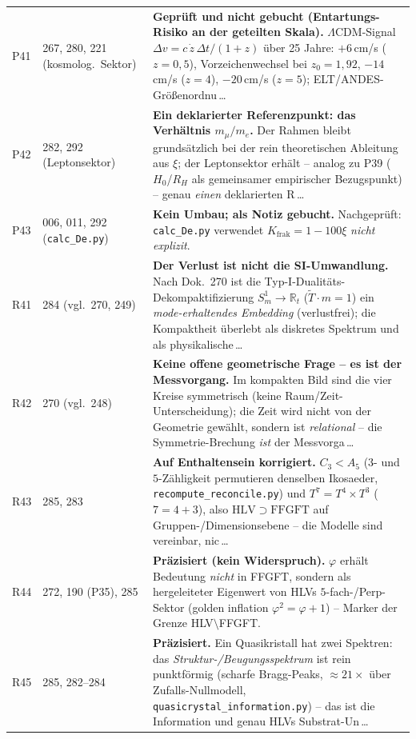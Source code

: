 \begin{longtable}{@{}p{0.9cm}p{3.1cm}p{10.2cm}@{}}
P41 & 267, 280, 221 (kosmolog.\ Sektor) & \textbf{Geprüft und nicht gebucht (Entartungs-Risiko an der geteilten Skala).} $\Lambda$CDM-Signal $\Delta v=c\,\dot z\,\Delta t/(1+z)$ über 25 Jahre: $+6$\,cm/s ($z{=}0{,}5$), Vorzeichenwechsel bei $z_0=1{,}92$, $-14$\,cm/s ($z{=}4$), $-20$\,cm/s ($z{=}5$); ELT/ANDES-Größenordnu\,\ldots \\
P42 & 282, 292 (Leptonsektor) & \textbf{Ein deklarierter Referenzpunkt: das Verhältnis $m_\mu/m_e$.} Der Rahmen bleibt grundsätzlich bei der rein theoretischen Ableitung aus $\xi$; der Leptonsektor erhält -- analog zu P39 ($H_0$/$R_H$ als gemeinsamer empirischer Bezugspunkt) -- genau \emph{einen} deklarierten R\,\ldots \\
P43 & 006, 011, 292 (\texttt{calc\_De.py}) & \textbf{Kein Umbau; als Notiz gebucht.} Nachgeprüft: \texttt{calc\_De.py} verwendet $K_{\text{frak}}=1-100\xi$ \emph{nicht explizit}. \\
R41 & 284 (vgl.\ 270, 249) & \textbf{Der Verlust ist nicht die SI-Umwandlung.} Nach Dok.~270 ist die Typ-I-Dualitäts-Dekompaktifizierung $S^1_m\!\to\!\mathbb{R}_t$ ($\tilde{T}\cdot m=1$) ein \emph{mode-erhaltendes Embedding} (verlustfrei); die Kompaktheit überlebt als diskretes Spektrum und als physikalische\,\ldots \\
R42 & 270 (vgl.\ 248) & \textbf{Keine offene geometrische Frage -- es ist der Messvorgang.} Im kompakten Bild sind die vier Kreise symmetrisch (keine Raum/Zeit-Unterscheidung); die Zeit wird nicht von der Geometrie gewählt, sondern ist \emph{relational} -- die Symmetrie-Brechung \emph{ist} der Messvorga\,\ldots \\
R43 & 285, 283 & \textbf{Auf Enthaltensein korrigiert.} $C_3<A_5$ ($3$- und $5$-Zähligkeit permutieren denselben Ikosaeder, \texttt{recompute\_reconcile.py}) und $T^7=T^4\times T^3$ ($7=4+3$), also $\mathrm{HLV}\supset\mathrm{FFGFT}$ auf Gruppen-/Dimensionsebene -- die Modelle sind vereinbar, nic\,\ldots \\
R44 & 272, 190 (P35), 285 & \textbf{Pr\"azisiert (kein Widerspruch).} $\varphi$ erh\"alt Bedeutung \emph{nicht} in FFGFT, sondern als hergeleiteter Eigenwert von HLVs $5$-fach-/Perp-Sektor (golden inflation $\varphi^2=\varphi+1$) -- Marker der Grenze HLV$\setminus$FFGFT. \\
R45 & 285, 282--284 & \textbf{Pr\"azisiert.} Ein Quasikristall hat zwei Spektren: das \emph{Struktur-/Beugungsspektrum} ist rein punktf\"ormig (scharfe Bragg-Peaks, $\approx21\times$ \"uber Zufalls-Nullmodell, \texttt{quasicrystal\_information.py}) -- das ist die Information und genau HLVs Substrat-Un\,\ldots \\

\end{longtable}
